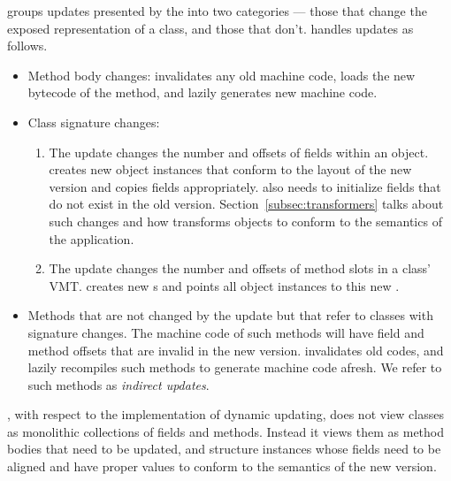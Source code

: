 \JV groups updates presented by the \UPT into two categories --- those that
change the exposed representation of a class, and those that don't. \JV
handles updates as follows.
\begin{itemize}
\item Method body changes: \JV invalidates any old machine code, loads the
new bytecode of the method, and lazily generates new machine code.
\item Class signature changes:
  \begin{enumerate}
  \item The update changes the number and offsets of fields within an object. \JV creates
        new object instances that conform to the layout of the new version
        and copies fields appropriately. \JV also needs to initialize
        fields that do not exist in the old version.
        Section~\ref{subsec:transformers}
        talks about such changes and how \JV transforms objects to conform
        to the semantics of the application.
  \item The update changes the number and offsets of method slots in a class' \acl{VMT}. \JV
        creates new \VMT{}s and points all object instances to this new \VMT.
  \end{enumerate}
\item Methods that are not changed by the update but that refer to classes
with signature changes. The machine code of such methods will have field
and method offsets that are invalid in the new version. \JV invalidates old
codes, and lazily recompiles
such methods to generate machine code afresh. We refer to such methods as
\emph{indirect updates}.
\end{itemize}

\JV, with respect to the implementation of dynamic updating, does not view
classes as monolithic collections of fields and methods. Instead it views
them as method bodies that need to be updated, and structure instances
whose fields need to be aligned and have proper values to conform to the
semantics of the new version.

